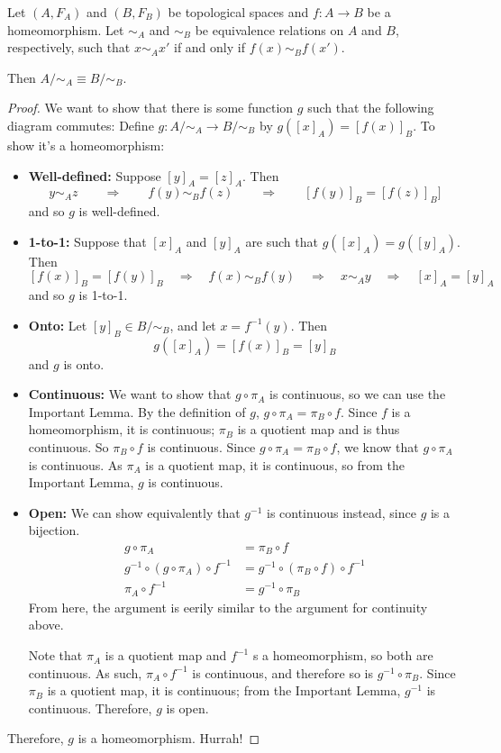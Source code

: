\begin{theorem}  Let $(A, F_A)$ and $(B, F_B)$ be topological spaces and $f:A\to B$ be a homeomorphism.  Let $\sim_A$ and $\sim_B$ be equivalence relations on $A$ and $B$, respectively, such that $x\sim_A x'$ if and only if $f(x) \sim_B f(x')$.

Then $A/\sim_A \equiv B/\sim_B$.
\end{theorem}
\begin{proof}
We want to show that there is some function $g$ such that the following diagram commutes:
\placeholder
Define $g:A/\sim_A \to B/\sim_B$ by $g\left([x]_A\right) = \left[ f(x) \right]_B$.  To show it's a homeomorphism:
\begin{itemize}
\item {\bf Well-defined:} Suppose $[y]_A = [z]_A$.  Then 
\[y\sim_A z\qquad\Rightarrow\qquad f(y) \sim_B f(z) \qquad\Rightarrow \qquad[f(y)]_B = [f(z)]_B]\]
and so $g$ is well-defined.
\item {\bf 1-to-1:} Suppose that $[x]_A$ and $[y]_A$ are such that $g([x]_A) = g([y]_A)$.  Then
\[ [f(x)]_B = [f(y)]_B\quad\Rightarrow\quad f(x)\sim_B f(y)\quad\Rightarrow\quad x\sim_A y \quad\Rightarrow\quad [x]_A = [y]_A\]
and so $g$ is 1-to-1.
\item {\bf Onto: } Let $[y]_B\in B/\sim_B$, and let $x = f^{-1}(y)$.  Then
\[ g([x]_A) = [f(x)]_B = [y]_B \]
and $g$ is onto.
\item {\bf Continuous: } We want to show that $g\circ \pi_A$ is continuous, so we can use the Important Lemma.  By the definition of $g$, $g\circ \pi_A = \pi_B\circ f$.  Since $f$ is a homeomorphism, it is continuous; $\pi_B$ is a quotient map and is thus continuous.  So $\pi_B\circ f$ is continuous.  Since $g\circ \pi_A = \pi_B\circ f$, we know that $g\circ \pi_A$ is continuous.  As $\pi_A$ is a quotient map, it is continuous, so from the Important Lemma, $g$ is continuous.
\item {\bf Open: }  We can show equivalently that $g^{-1}$ is continuous instead, since $g$ is a bijection.
\begin{align*}
g\circ\pi_A &= \pi_B\circ f \\
g^{-1}\circ(g\circ\pi_A)\circ f^{-1} &= g^{-1}\circ(\pi_B\circ f)\circ f^{-1} \\
\pi_A\circ f^{-1} & =g^{-1}\circ \pi_B
\end{align*}
From here, the argument is eerily similar to the argument for continuity above.

Note that $\pi_A$ is a quotient map and $f^{-1}$ s a homeomorphism, so both are continuous.  As such, $\pi_A\circ f^{-1}$ is continuous, and therefore so is $g^{-1}\circ \pi_B$.  Since $\pi_B$ is a quotient map, it is continuous; from the Important Lemma, $g^{-1}$ is continuous.  Therefore, $g$ is open.
\end{itemize}
Therefore, $g$ is a homeomorphism. Hurrah!
\end{proof}






